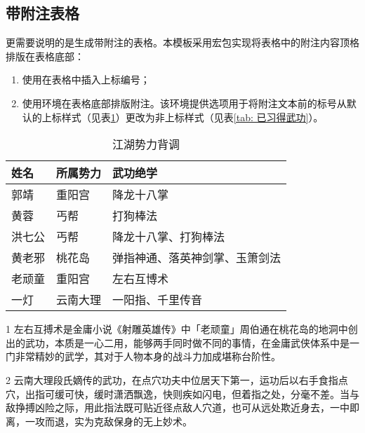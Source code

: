 \documentclass[doctor, vlined]{DissertUESTC}
\begin{document}
	
	\newpage
	\subsection{带附注表格}
	
	更需要说明的是生成带附注的表格。本模板采用宏包实现将表格中的附注内容顶格排版在表格底部：
	\begin{enumerate}
		\item 使用在表格中插入上标编号；
		\setcounter{enumi}{98}%
		\item 使用环境在表格底部排版附注。该环境提供选项用于将附注文本前的标号从默认的上标样式（见表\ref{tab: 江湖势力背调}）更改为非上标样式（见表\ref{tab: 已习得武功}）。
	\end{enumerate}
	
	\begin{table}[!ht]
		\caption{江湖势力背调} \label{tab: 江湖势力背调}
		\begin{threeparttable}
			\begin{tabular}{p{2cm} p{3cm} p{7cm}}
				\toprule
				\textbf{姓名} & \textbf{所属势力} & \textbf{武功绝学} \\
				\midrule
				郭靖 & 重阳宫 & 降龙十八掌 \\
				黄蓉 & 丐帮 & 打狗棒法 \\
				洪七公 & 丐帮 & 降龙十八掌、打狗棒法 \\
				黄老邪 & 桃花岛 & 弹指神通、落英神剑掌、玉箫剑法 \\
				老顽童 & 重阳宫 & 左右互博术\tnote{1} \\
				一灯 & 云南大理 & 一阳指\tnote{2}、千里传音 \\
				\bottomrule
			\end{tabular}
			\begin{tablenotes}
				\item[1] 左右互搏术是金庸小说《射雕英雄传》中「老顽童」周伯通在桃花岛的地洞中创出的武功，本质是一心二用，能够两手同时做不同的事情，在金庸武侠体系中是一门非常精妙的武学，其对于人物本身的战斗力加成堪称台阶性。
				\item[2] 云南大理段氏嫡传的武功，在点穴功夫中位居天下第一，运功后以右手食指点穴，出指可缓可快，缓时潇洒飘逸，快则疾如闪电，但着指之处，分毫不差。当与敌挣搏凶险之际，用此指法既可贴近径点敌人穴道，也可从远处欺近身去，一中即离，一攻而退，实为克敌保身的无上妙术。
			\end{tablenotes}
		\end{threeparttable}
	\end{table}
	
\end{document}
